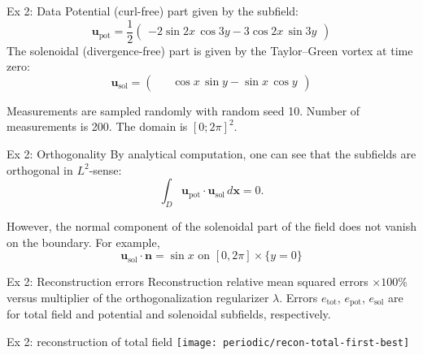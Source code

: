 \documentclass[11pt,aspectratio=169,t]{beamer}
\def\\{}%
\renewcommand{\vec}[1]{\boldsymbol{#1}}
\newcommand{\upot}{\vec u_{\text{pot}}}
\newcommand{\usol}{\vec u_{\text{sol}}}
\begin{document}
\begin{frame}{Ex 2: Data}
Potential (curl-free) part given by the subfield:
\[
    \upot = \frac12 \left(
        \begin{array}{r}
        -2 \sin 2x \, \cos 3y \\
        -3 \cos 2x \, \sin 3y
    \end{array}
    \right)
\]
The solenoidal (divergence-free) part is given by the Taylor--Green vortex at
time zero:
\[
    \usol = \left(
    \begin{array}{c}
        \phantom{-} \cos x \, \sin y \\
        -\sin x \, \cos y
    \end{array}
    \right)
\]

Measurements are sampled randomly with random seed 10. Number of measurements
is 200. The domain is $[0; 2 \pi]^2$.
\end{frame}

\begin{frame}{Ex 2: Orthogonality}
By analytical computation, one can see that the subfields are orthogonal
in $L^{2}$-sense:
\[
    \int_D \upot \cdot \usol \, d\vec x = 0.
\]

\vspace{1cm}
However, the normal component of the solenoidal part of the field does not
vanish on the boundary.
For example,
\[
  \usol \cdot \vec n = \sin x \text{ on } [0, 2\pi] \times \{y=0\}
\]
\end{frame}

\begin{frame}{Ex 2: Reconstruction errors}
Reconstruction relative mean squared errors $\times 100\%$ versus multiplier of the
orthogonalization regularizer $\lambda$.
Errors $e_{\text{tot}}$, $e_{\text{pot}}$, $e_{\text{sol}}$ are for total field
and potential and solenoidal subfields, respectively.

\centering

\end{frame}


\begin{frame}{Ex 2: reconstruction of total field}
\centering
\vspace{0.5cm}
\texttt{[image: periodic/recon-total-first-best]}
\end{frame}
\end{document}
